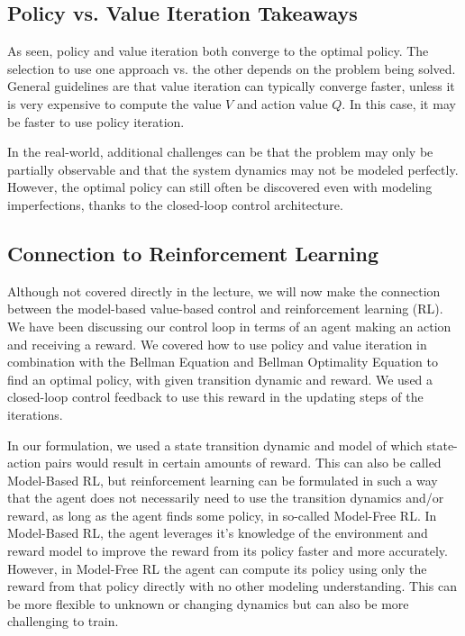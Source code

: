 \documentclass[11pt]{article}
\begin{document}
\subsection{Policy vs. Value Iteration Takeaways}

As seen, policy and value iteration both converge to the optimal policy. The selection to use one approach vs. the other depends on the problem being solved. General guidelines are that value iteration can typically converge faster, unless it is very expensive to compute the value $V$ and action value $Q$. In this case, it may be faster to use policy iteration. 

In the real-world, additional challenges can be that the problem may only be partially observable and that the system dynamics may not be modeled perfectly. However, the optimal policy can still often be discovered even with modeling imperfections, thanks to the closed-loop control architecture.

\subsection{Connection to Reinforcement Learning}
Although not covered directly in the lecture, we will now make the connection between the model-based value-based control and reinforcement learning (RL). We have been discussing our control loop in terms of an agent making an action and receiving a reward. We covered how to use policy and value iteration in combination with the Bellman Equation and Bellman Optimality Equation to find an optimal policy, with given transition dynamic and reward. We used a closed-loop control feedback to use this reward in the updating steps of the iterations. 

In our formulation, we used a state transition dynamic and model of which state-action pairs would result in certain amounts of reward. This can also be called Model-Based RL, but reinforcement learning can be formulated in such a way that the agent does not necessarily need to use the transition dynamics and/or reward, as long as the agent finds some policy, in so-called Model-Free RL. In Model-Based RL, the agent leverages it's knowledge of the environment and reward model to improve the reward from its policy faster and more accurately. However, in Model-Free RL the agent can compute its policy using only the reward from that policy directly with no other modeling understanding. This can be more flexible to unknown or changing dynamics but can also be more challenging to train.
\end{document}

